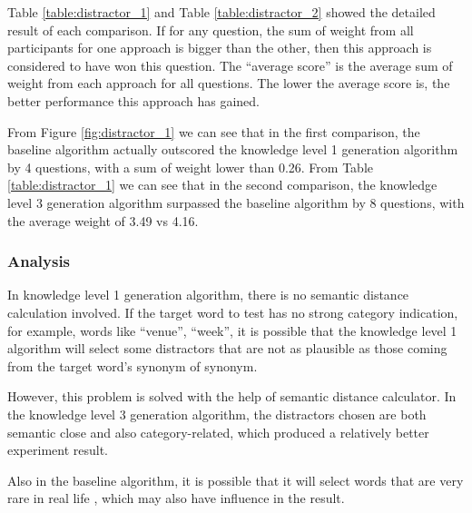 Table \ref{table:distractor_1} and Table \ref{table:distractor_2} showed the detailed result of each comparison. If for any question, the sum of weight from all participants for one approach is bigger than the other, then this approach is considered to have won this question. The “average score” is the average sum of weight from each approach for all questions. The lower the average score is, the better performance this approach has gained.

From Figure \ref{fig:distractor_1} we can see that in the first comparison, the baseline algorithm actually outscored the knowledge level 1 generation algorithm by 4 questions, with a sum of weight lower than 0.26. From Table \ref{table:distractor_1} we can see that in the second comparison, the knowledge level 3 generation algorithm surpassed the baseline algorithm by 8 questions, with the average weight of 3.49 vs 4.16. 

\subsubsection{Analysis}
In knowledge level 1 generation algorithm, there is no semantic distance calculation involved. If the target word to test has no strong category indication, for example, words like “venue”, “week”, it is possible that the knowledge level 1 algorithm will select some distractors that are not as plausible as those coming from the target word’s synonym of synonym. 

However, this problem is solved with the help of semantic distance calculator. In the knowledge level 3 generation algorithm, the distractors chosen are both semantic close and also category-related, which produced a relatively better experiment result.

Also in the baseline algorithm, it is possible that it will select words that are very rare in real life \cite{sus13}, which may also have influence in the result.

